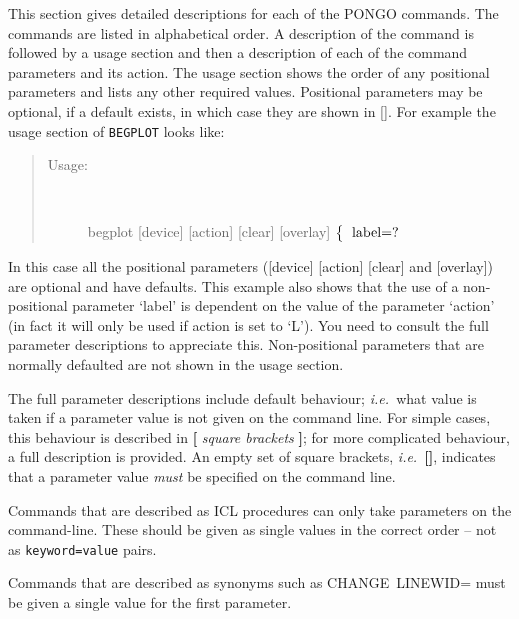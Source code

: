 \documentclass[twoside,11pt]{article}
\newcommand{\htmlref}[2]{#1}
\renewcommand{\_}{\texttt{\symbol{95}}}
\newcommand{\ie}{{\em i.e.\ }}
\newcommand{\cnam}[1]{{\tt #1}}
\newcommand{\iref} [1]{\htmlref{#1}{#1}}
\newcommand{\sstusage}[1]{\item[Usage:] \mbox{}
\\[1.3ex]{\raggedright \ssttt #1}}
\newcommand{\sstusage}[1]{\item[Usage:]
      \begin{description}
         {\ssttt #1}
      \end{description}
      \\
   }
\begin{document}
This section gives detailed descriptions for each of the PONGO
commands.  The commands are listed in alphabetical order.  A
description of the command is followed by a usage section and then a
description of each of the command parameters and its action.  The
usage section shows the order of any positional parameters and lists
any other required values. Positional parameters may be optional, if
a default exists, in which case they are shown in [].  For example the usage
section of \cnam{\iref{BEGPLOT}} looks like:
\begin{quote}
\begin{description}
\sstusage{
      begplot [device] [action] [clear] [overlay]
        \newline\hspace*{1.5em}
        $\left\{ {\begin{tabular}{l}
                                      label=? \\
                  \end{tabular} }
        \right.$
        \newline\hspace*{1.9em}
        \makebox[0mm][c]{\small action}
   }
\end{description}
\end{quote}
In this case all the positional parameters ([device] [action] [clear]
and [overlay]) are optional and have defaults. This example also
shows that the use of a non-positional parameter `label' is dependent on
the value of the parameter `action' (in fact it will only be used if
action is set to `L'). You need to consult the full parameter
descriptions to appreciate this. Non-positional parameters that are
normally defaulted are not shown in the usage section.

The full parameter descriptions include default behaviour; \ie what
value is taken if a parameter value is not given on the command line.
For simple cases, this behaviour is described in {\bf[} {\em square
brackets} {\bf]}; for more complicated behaviour, a full description
is provided.  An empty set of square brackets, \ie {\bf []}, indicates
that a parameter value {\em must} be specified on the command line.

Commands that are described as ICL procedures can only take
parameters on the command-line. These should be given as single
values in the correct order -- not as \verb+keyword=value+ pairs.

Commands that are described as synonyms such as \iref{CHANGE}~LINEWID=
must be given a single value for the first parameter.
\end{document}
